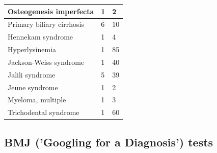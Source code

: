 \documentclass[10pt,letterpaper,two column,final]{article}
\begin{document}
\begin{center}
\begin{small}
\begin{longtable}{|p{6cm}|p{1.8cm}|p{1.8cm}|}
    Osteogenesis imperfecta & 1 & 2\\    \hline
    Primary biliary cirrhosis & 6 & 10\\    \hline
    Hennekam syndrome  & 1 & 4\\    \hline
    Hyperlysinemia& 1 & 85\\    \hline
    Jackson-Weiss syndrome & 1 & 40\\    \hline
    Jalili syndrome &  5 & 39 \\    \hline
    Jeune syndrome & 1 & 2\\    \hline
    Myeloma, multiple & 1 & 3\\    \hline
    Trichodental syndrome & 1 & 60\\    \hline
    \end{longtable}
\end{small}
\end{center}

\subsection{BMJ ('Googling for a Diagnosis') tests }
\label{app:bmj_old_new}
\end{document}
